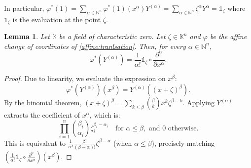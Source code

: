 \documentclass[a4paper,11p]{amsart}
\newtheorem{lemma0}[defn0]{Lemma}
\newenvironment{lemma}{\bigskip \begin{lemma0}}{\end{lemma0}}
\newcommand{\K}{\mathbb K}
\begin{document}
In particular,
$\varphi^*(1)=\sum_{\alpha\in \mathbb N^n} \varphi^*(1)(x^\alpha) Y^{(\alpha)}=\sum_{\alpha\in \mathbb N^n} \zeta^\alpha Y^{\alpha}= \mathds{1}_\zeta$ where $ \mathds{1}_\zeta $ is the evaluation at the point $ \zeta $.

\begin{lemma}\label{lemma:DualChangeBasis}
Let $ \K $ be a field of characteristic zero. Let $ \zeta \in \K^n $ and $ \varphi$ be the affine change of coordinates of \eqref{affine:tranlsation}. Then, for every $ \alpha \in \mathbb{N}^n $,
\[
\varphi^*\left(Y^{(\alpha)}\right) = \frac{1}{\alpha!} \mathds{1}_\zeta \circ \frac{\partial^\alpha}{\partial x^\alpha}.
\]
\end{lemma}

\begin{proof}
Due to linearity, we evaluate the expression on $x^\beta$:
\[
\varphi^*\left(Y^{(\alpha)}\right)\left(x^\beta\right) = Y^{(\alpha)}\left((x + \zeta)^\beta\right).
\]
By the binomial theorem, $(x + \zeta)^\beta = \sum_{k \le \beta} \binom{\beta}{k} x^k \zeta^{\beta - k}$. Applying $Y^{(\alpha)}$ extracts the coefficient of $x^\alpha$, which is:
\[
\prod_{i=1}^n \binom{\beta_i}{\alpha_i} \zeta_i^{\beta_i - \alpha_i} \quad \text{for } \alpha \leq \beta, \text{ and } 0 \text{ otherwise}.
\]
This is equivalent to $\frac{1}{\alpha!} \frac{\beta!}{(\beta - \alpha)!} \zeta^{\beta - \alpha}$ (when $\alpha \le \beta$), precisely matching $\left(\frac{1}{\alpha!} \mathds{1}_\zeta \circ \frac{\partial^\alpha}{\partial x^\alpha}\right)\left(x^\beta\right)$.
\end{proof}

\end{document}
